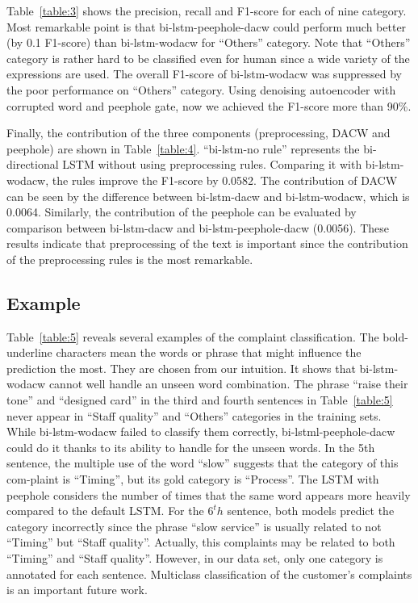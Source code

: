 Table~\ref{table:3} shows the precision, recall and F1-score
for each of nine category.
Most remarkable point is that bi-lstm-peephole-dacw could perform much better
(by 0.1 F1-score) than bi-lstm-wodacw for ``Others'' category. 
Note that ``Others'' category is rather hard to be classified even
for human since a wide variety of the expressions are used.
The overall F1-score of bi-lstm-wodacw was suppressed by the poor performance
on ``Others'' category. 
Using denoising autoencoder with corrupted word and peephole gate,
now we achieved the F1-score more than 90\%.



Finally, the contribution of the three components (preprocessing, DACW and peephole)
are shown in Table~\ref{table:4}.
``bi-lstm-no rule'' represents the bi-directional LSTM without
using preprocessing rules.
Comparing it with bi-lstm-wodacw, the rules improve the F1-score by 0.0582.
The contribution of DACW can be seen by the difference between bi-lstm-dacw
and bi-lstm-wodacw, which is 0.0064.
Similarly, the contribution of the peephole can be evaluated by comparison
between bi-lstm-dacw and bi-lstm-peephole-dacw (0.0056).
These results indicate that preprocessing of the text is important
since the contribution of the preprocessing rules is the most remarkable.



\subsection{Example}
Table~\ref{table:5} reveals several examples of the complaint classification.
The bold-underline characters mean the words or phrase that might
influence the prediction the most.
They are chosen from our intuition.
It shows that bi-lstm-wodacw cannot well handle an unseen word combination.
The phrase ``raise their tone'' and ``designed card'' in the third and
fourth sentences in Table~\ref{table:5} never appear in ``Staff quality'' and
``Others'' categories in the training sets.
While bi-lstm-wodacw failed to classify them correctly,
bi-lstml-peephole-dacw could do it thanks to its ability to handle
for the unseen words.
In the 5th sentence, the multiple use of the word ``slow'' suggests
that the category of this com-plaint is ``Timing'',
but its gold category is ``Process''.
The LSTM with peephole considers the number of times that the same 
word appears more heavily compared to the default LSTM. 
For the $6^th$ sentence, both models predict the category incorrectly 
since the phrase ``slow service'' is usually related to not 
``Timing'' but ``Staff quality''. 
Actually, this complaints may be related to both ``Timing'' and ``Staff quality''.
However, in our data set, only one category is annotated for each sentence.
Multiclass classification of the customer's complaints is an important future work.
